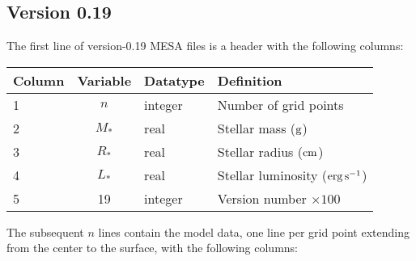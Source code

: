 \documentclass{article}
\newcommand{\Rstar}{\ensuremath{R_{\ast}}}
\newcommand{\Mstar}{\ensuremath{M_{\ast}}}
\newcommand{\Lstar}{\ensuremath{L_{\ast}}}
\newcommand{\cm}{\ensuremath{{\rm cm}}}
\newcommand{\gram}{\ensuremath{{\rm g}}}
\newcommand{\second}{\ensuremath{{\rm s}}}
\newcommand{\erg}{\ensuremath{{\rm erg}}}
\begin{document}
\newpage

\subsection*{Version 0.19}

The first line of version-0.19 MESA files is a header with the following
columns:

\begin{table}[h!]
\begin{tabular}{|l|c|l|l|} \hline
Column & Variable & Datatype & Definition \\ \hline
1      & $n$ & integer & Number of grid points \\
2      & \Mstar & real & Stellar mass ($\gram$) \\
3      & \Rstar & real & Stellar radius ($\cm$) \\
4      & \Lstar & real & Stellar luminosity ($\erg\,\second^{-1}$) \\
5      & 19     & integer & Version number $\times 100$ \\ \hline
\end{tabular}
\end{table}

The subsequent $n$ lines contain the model data, one line per
grid point extending from the center to the surface, with the following columns:
\end{document}
